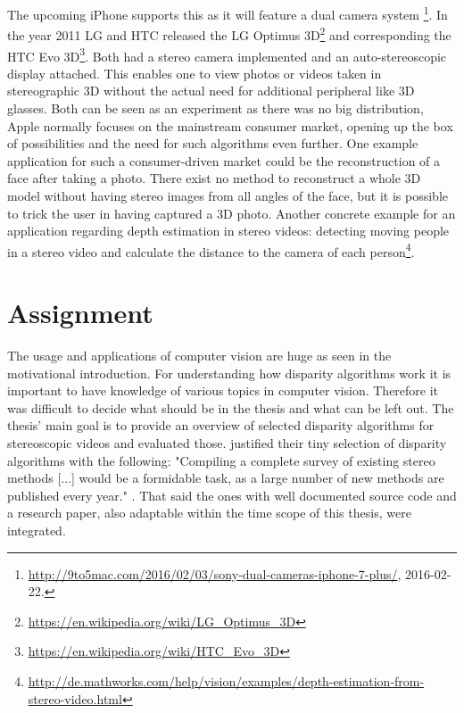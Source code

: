 The upcoming iPhone supports this as it will feature a dual camera system \footnote{\url{http://9to5mac.com/2016/02/03/sony-dual-cameras-iphone-7-plus/}, 2016-02-22.}.
In the year 2011 LG and HTC released the LG Optimus 3D\footnote{\url{https://en.wikipedia.org/wiki/LG_Optimus_3D} } and corresponding the HTC Evo 3D\footnote{\url{https://en.wikipedia.org/wiki/HTC_Evo_3D}}.
Both had a stereo camera implemented and an auto-stereoscopic display attached.
This enables one to view photos or videos taken in stereographic 3D without the actual need for additional peripheral like 3D glasses.
Both can be seen as an experiment as there was no big distribution, Apple normally focuses on the mainstream consumer market, opening up the box of possibilities and the need for such algorithms even further.
One example application for such a consumer-driven market could be the reconstruction of a face after taking a photo.
There exist no method to reconstruct a whole 3D model without having stereo images from all angles of the face, but it is possible to trick the user in having captured a 3D photo.
Another concrete example for an application regarding depth estimation in stereo videos: detecting moving people in a stereo video and calculate the distance to the camera of each person\footnote{\url{http://de.mathworks.com/help/vision/examples/depth-estimation-from-stereo-video.html}}.

\section{Assignment}

The usage and applications of computer vision are huge as seen in the motivational introduction.
For understanding how disparity algorithms work it is important to have knowledge of various topics in computer vision.
Therefore it was difficult to decide what should be in the thesis and what can be left out.
The thesis' main goal is to provide an overview of selected disparity algorithms for stereoscopic videos and evaluated those.
\citeauthor{scharstein2002taxonomy} justified their tiny selection of disparity algorithms with the following: "Compiling a complete survey of existing stereo methods [...] would be a formidable task, as a large number of new methods are published every year." \citep{scharstein2002taxonomy}.
That said the ones with well documented source code and a research paper, also adaptable within the time scope of this thesis, were integrated.

